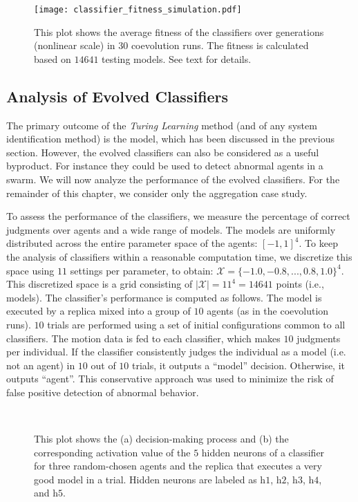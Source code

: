 \begin{figure}[!t]
	\centering
	\texttt{[image: classifier\_fitness\_simulation.pdf]}
	\caption{This plot shows the average fitness of the classifiers over generations (nonlinear scale) in $30$ coevolution runs. The fitness is calculated based on $14641$ testing models. See text for details.}
	\label{fig:classifier_fitness_swarm_simulation}
\end{figure}

\subsection{Analysis of Evolved Classifiers}\label{sec:analysis_evolved_classifiers_swarm_simulation}

The primary outcome of the \textit{Turing Learning} method (and of any system identification method) is the model, which has been discussed in the previous section. However, the evolved classifiers can also be considered as a useful byproduct. For instance they could be used to detect abnormal agents in a swarm. We will now analyze the performance of the evolved classifiers. For the remainder of this chapter, we consider only the aggregation case study.

To assess the performance of the classifiers, we measure the percentage of correct judgments over agents and a wide range of models. The models are uniformly distributed across the entire parameter space of the agents: $[-1,1]^4$. To keep the analysis of classifiers within a reasonable computation time, we discretize this space using $11$ settings per parameter, to obtain: $\mathcal{X} = \{-1.0, -0.8, ..., 0.8, 1.0\}^4$. This discretized space is a grid consisting of $|\mathcal{X}|=11^4=14641$ points (i.e., models). The classifier's performance is computed as follows. The model is executed by a replica mixed into a group of $10$ agents (as in the coevolution runs). $10$ trials are performed using a set of initial configurations common to all classifiers. The motion data is fed to each classifier, which makes $10$ judgments per individual. If the classifier consistently judges the individual as a model (i.e. not an agent) in $10$ out of $10$ trials, it outputs a ``model'' decision. Otherwise, it outputs ``agent''. This conservative approach was used to minimize the risk of false positive detection of abnormal behavior.
\begin{figure}[!t]%
	\centering
		\\
		\caption{This plot shows the (a) decision-making process and (b) the corresponding activation value of the $5$ hidden neurons of a classifier for three random-chosen agents and the replica that executes a very good model in a trial. Hidden neurons are labeled as $\textrm{h}1$, $\textrm{h}2$, $\textrm{h}3$, $\textrm{h}4$, and $\textrm{h}5$.}
		\label{fig:classifier_output}
\end{figure}
